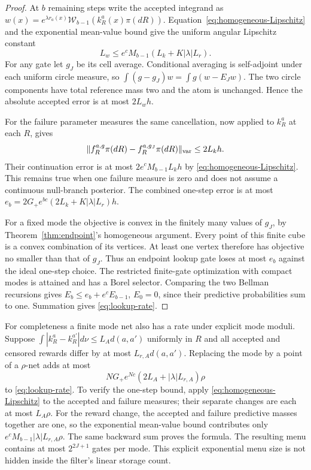 \begin{proof}
At $b$ remaining steps write the accepted integrand as
$w(x)=e^{\lambda r_a(x)}\mathcal W_{b-1}(k_R^a(x)\pi(dR))$.
Equation~\eqref{eq:homogeneous-Lipschitz} and the exponential mean-value
bound give the uniform angular Lipschitz constant
\[
 L_w\le e^c M_{b-1}(L_k+K|\lambda|L_r).
\]
For any gate let $g_J$ be its cell average. Conditional averaging is
self-adjoint under each uniform circle measure, so
$\int(g-g_J)w=\int g(w-E_Jw)$. The two circle components have total
reference mass two and the atom is unchanged. Hence the absolute accepted
error is at most $2L_wh$.

For the failure parameter measures the same cancellation, now applied to
$k_R^a$ at each $R$, gives
\[
 \|f_R^{a,g}\pi(dR)-f_R^{a,g_J}\pi(dR)\|_{\rm var}
 \le 2L_kh.
\]
Their continuation error is at most $2e^cM_{b-1}L_kh$ by
\eqref{eq:homogeneous-Lipschitz}. This remains true when one failure
measure is zero and does not assume a continuous null-branch posterior.
The combined one-step error is at most
$e_b=2G_+e^{bc}(2L_k+K|\lambda|L_r)h$.

For a fixed mode the objective is convex in the finitely many values of
$g_J$, by Theorem~\ref{thm:endpoint}'s homogeneous argument. Every point
of this finite cube is a convex combination of its vertices. At least one
vertex therefore has objective no smaller than that of $g_J$. Thus an
endpoint lookup gate loses at most $e_b$ against the ideal one-step choice.
The restricted finite-gate optimization with compact modes is attained and
has a Borel selector. Comparing the two Bellman recursions gives
$E_b\le e_b+e^cE_{b-1}$, $E_0=0$, since their predictive probabilities sum
to one. Summation gives \eqref{eq:lookup-rate}.
\end{proof}

For completeness a finite mode net also has a rate under explicit mode
moduli. Suppose $\int|k_R^a-k_R^{a'}|d\nu\le L_A d(a,a')$ uniformly in $R$
and all accepted and censored rewards differ by at most
$L_{r,A}d(a,a')$. Replacing the mode by a point of a $\rho$-net adds at most
\[
 N G_+e^{Nc}(2L_A+|\lambda|L_{r,A})\rho
\]
to \eqref{eq:lookup-rate}. To verify the one-step bound, apply
\eqref{eq:homogeneous-Lipschitz} to the accepted and failure measures;
their separate changes are each at most $L_A\rho$. For the reward change,
the accepted and failure predictive masses together are one, so the
exponential mean-value bound contributes only
$e^cM_{b-1}|\lambda|L_{r,A}\rho$. The same backward sum proves the formula.
The resulting menu contains at most $2^{2J+1}$ gates per mode. This explicit
exponential menu size is not hidden inside the filter's linear storage count.
